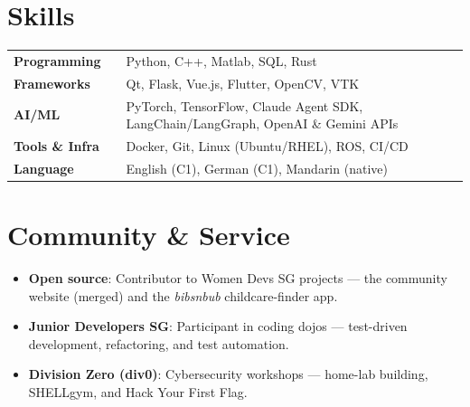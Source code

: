 \documentclass[a4paper,10pt]{article}
\newenvironment{zitemize}{
\vspace{0.1cm}
\begin{itemize}\itemsep 1.5pt \parskip 2pt \parsep 5pt}
{\end{itemize}\vspace{-0.3cm}}
\newcommand{\hskills}[1]{
\textbf{\bfseries #1} }
\begin{document}

\section{Skills}
\begin{tabular}{p{11em} p{1em} p{43em}}
\hskills{Programming} && Python, C++, Matlab, SQL, Rust\\
\hskills{Frameworks} && Qt, Flask, Vue.js, Flutter, OpenCV, VTK \\
\hskills{AI/ML} && PyTorch, TensorFlow, Claude Agent SDK, LangChain/LangGraph, OpenAI \& Gemini APIs\\
\hskills{Tools \& Infra} && Docker, Git, Linux (Ubuntu/RHEL), ROS, CI/CD \\
\hskills{Language} && English (C1), German (C1), Mandarin (native) \\
\end{tabular}

\section{Community \& Service}
\begin{zitemize}
    \item \textbf{Open source}: Contributor to Women Devs SG projects --- the community website (merged) and the \textit{bibsnbub} childcare-finder app.
    \item \textbf{Junior Developers SG}: Participant in coding dojos --- test-driven development, refactoring, and test automation.
    \item \textbf{Division Zero (div0)}: Cybersecurity workshops --- home-lab building, SHELLgym, and Hack Your First Flag.
\end{zitemize}
\end{document}
